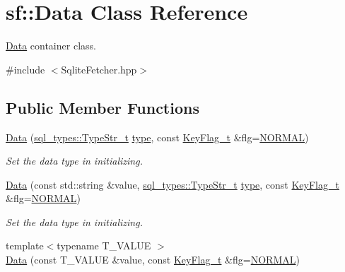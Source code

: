 \hypertarget{classsf_1_1Data}{}\section{sf\+:\+:Data Class Reference}
\label{classsf_1_1Data}


\hyperlink{classsf_1_1Data}{Data} container class.  




{\ttfamily \#include $<$Sqlite\+Fetcher.\+hpp$>$}

\subsection*{Public Member Functions}
\begin{DoxyCompactItemize}
\item 
\hyperlink{classsf_1_1Data_a769fa07620e67e3d5a6d496f8777e770}{Data} (\hyperlink{namespacesf_1_1sql__types_a1a4f114cdf79706d2298e3454006e65b}{sql\+\_\+types\+::\+Type\+Str\+\_\+t} \hyperlink{classsf_1_1Data_ae7321e2f6bb059074d30ddddcdd7409d}{type}, const \hyperlink{namespacesf_ab38d6ab0cbacec81e7d09c0d53feb958}{Key\+Flag\+\_\+t} \&flg=\hyperlink{namespacesf_a50b38ab4427343bee97887908a3fb1c8}{N\+O\+R\+M\+AL})
\begin{DoxyCompactList}\small\item\em Set the data type in initializing. \end{DoxyCompactList}\item 
\hyperlink{classsf_1_1Data_ad53ebd8c5a2798dd38f54a274881ba35}{Data} (const std\+::string \&value, \hyperlink{namespacesf_1_1sql__types_a1a4f114cdf79706d2298e3454006e65b}{sql\+\_\+types\+::\+Type\+Str\+\_\+t} \hyperlink{classsf_1_1Data_ae7321e2f6bb059074d30ddddcdd7409d}{type}, const \hyperlink{namespacesf_ab38d6ab0cbacec81e7d09c0d53feb958}{Key\+Flag\+\_\+t} \&flg=\hyperlink{namespacesf_a50b38ab4427343bee97887908a3fb1c8}{N\+O\+R\+M\+AL})
\begin{DoxyCompactList}\small\item\em Set the data type in initializing. \end{DoxyCompactList}\item 
{\footnotesize template$<$typename T\+\_\+\+V\+A\+L\+UE $>$ }\\\hyperlink{classsf_1_1Data_ae5c8d4e4df0050e0c86614d38c00c07d}{Data} (const T\+\_\+\+V\+A\+L\+UE \&value, const \hyperlink{namespacesf_ab38d6ab0cbacec81e7d09c0d53feb958}{Key\+Flag\+\_\+t} \&flg=\hyperlink{namespacesf_a50b38ab4427343bee97887908a3fb1c8}{N\+O\+R\+M\+AL})

\end{DoxyCompactItemize}
